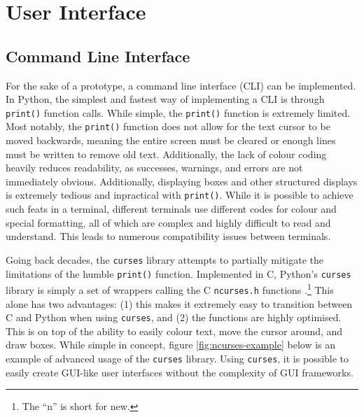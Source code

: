 \documentclass[11pt]{article}
\begin{document}
\newpage

\section{User Interface}

\subsection{Command Line Interface}

For the sake of a prototype, a command line interface (CLI) can be implemented. In Python, the simplest and fastest way of implementing a CLI is through \texttt{print()} function calls. While simple, the \texttt{print()} function is extremely limited. Most notably, the \texttt{print()} function does not allow for the text cursor to be moved backwards, meaning the entire screen must be cleared or enough lines must be written to remove old text. Additionally, the lack of colour coding heavily reduces readability, as successes, warnings, and errors are not immediately obvious. Additionally, displaying boxes and other structured displays is extremely tedious and inpractical with \texttt{print()}. While it is possible to achieve such feats in a terminal, different terminals use different codes for colour and special formatting, all of which are complex and highly difficult to read and understand. This leads to numerous compatibility issues between terminals.

Going back decades, the \texttt{curses} library attempts to partially mitigate the limitations of the humble \texttt{print()} function. Implemented in C, Python's \texttt{curses} library is simply a set of wrappers calling the C \texttt{ncurses.h} functions \cite{curses-python} \cite{ncurses}.\footnote{The ``n'' is short for new.} This alone has two advantages: (1) this makes it extremely easy to transition between C and Python when using \texttt{curses}, and (2) the functions are highly optimised. This is on top of the ability to easily colour text, move the cursor around, and draw boxes. While simple in concept, figure \ref{fig:ncurses-example} below is an example of advanced usage of the \texttt{curses} library. Using \texttt{curses}, it is possible to easily create GUI-like user interfaces without the complexity of GUI frameworks.
\end{document}
